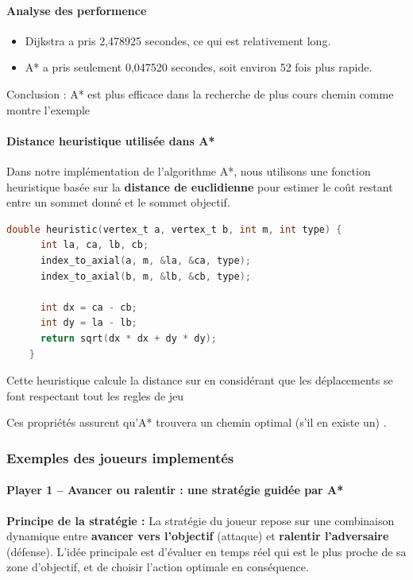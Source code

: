 \paragraph{Analyse des performence}
\begin{itemize}
    \item Dijkstra a pris 2,478925 secondes, ce qui est relativement long.
    \item A* a pris seulement 0,047520 secondes, soit environ 52 fois plus rapide.
\end{itemize}
Conclusion :  A* est plus efficace dans la recherche de plus cours chemin comme montre l'exemple 

\paragraph{Distance heuristique utilisée dans A*}

Dans notre implémentation de l’algorithme A*, nous utilisons une fonction heuristique basée sur la \textbf{distance de euclidienne} pour estimer le coût restant entre un sommet donné et le sommet objectif.

\begin{lstlisting}[language=C]
  double heuristic(vertex_t a, vertex_t b, int m, int type) {
      int la, ca, lb, cb;
      index_to_axial(a, m, &la, &ca, type);
      index_to_axial(b, m, &lb, &cb, type);

      int dx = ca - cb;
      int dy = la - lb;
      return sqrt(dx * dx + dy * dy);
    }

    \end{lstlisting}

Cette heuristique calcule la distance  sur  en considérant que les déplacements se font respectant tout les regles de jeu 


Ces propriétés assurent qu’A* trouvera un chemin optimal (s'il en existe un) .



\subsubsection{Exemples des joueurs implementés}

\paragraph{Player 1 – Avancer ou ralentir : une stratégie guidée par A*}

\noindent
\textbf{Principe de la stratégie :} La stratégie du joueur repose sur une combinaison dynamique entre \textbf{avancer vers l’objectif} (attaque) et \textbf{ralentir l’adversaire} (défense). L’idée principale est d’évaluer en temps réel qui est le plus proche de sa zone d’objectif, et de choisir l’action optimale en conséquence.

